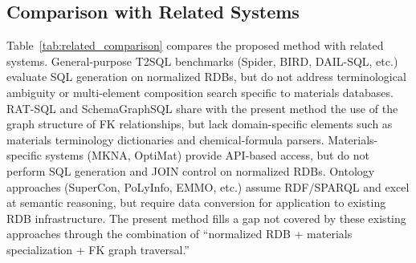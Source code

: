 \documentclass[5p,twocolumn]{elsarticle}
\begin{document}
\subsection{Comparison with Related Systems}

Table~\ref{tab:related_comparison} compares the proposed method with related systems.
General-purpose T2SQL benchmarks (Spider, BIRD, DAIL-SQL, etc.)
evaluate SQL generation on normalized RDBs, but do not address
terminological ambiguity or multi-element composition search specific to materials databases.
RAT-SQL and SchemaGraphSQL share with the present method the use of the graph structure of FK relationships,
but lack domain-specific elements such as materials terminology dictionaries and chemical-formula parsers.
Materials-specific systems (MKNA, OptiMat)
provide API-based access,
but do not perform SQL generation and JOIN control on normalized RDBs.
Ontology approaches (SuperCon, PoLyInfo, EMMO, etc.)
assume RDF/SPARQL and excel at semantic reasoning,
but require data conversion for application to existing RDB infrastructure.
The present method fills a gap not covered by these existing approaches
through the combination of ``normalized RDB + materials specialization + FK graph traversal.''
\end{document}

